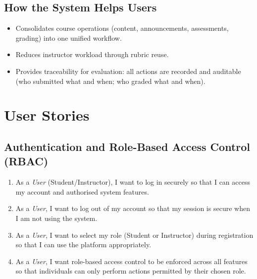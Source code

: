 \documentclass[11pt, legalpaper]{article}
\begin{document}
\subsection{How the System Helps Users}
\begin{itemize}
  \item Consolidates course operations (content, announcements, assessments,
        grading) into one unified workflow.
  \item Reduces instructor workload through rubric reuse.
  \item Provides traceability for evaluation: all actions are recorded and
        auditable (who submitted what and when; who graded what and when).
\end{itemize}

\section{User Stories}

\subsection{Authentication and Role-Based Access Control (RBAC)}
\begin{enumerate}[label=\textbf{US\,\arabic*}]
  \item As a \emph{User} (Student/Instructor), I want to log in securely so
        that I can access my account and authorised system features.
  \item As a \emph{User}, I want to log out of my account so that my session
        is secure when I am not using the system.
  \item As a \emph{User}, I want to select my role (Student or Instructor)
        during registration so that I can use the platform appropriately.
  \item As a \emph{User}, I want role-based access control to be enforced
        across all features so that individuals can only perform actions
        permitted by their chosen role.
\end{enumerate}
\end{document}

